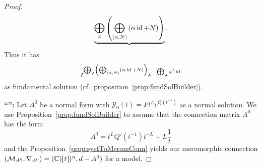 \begin{proof}
\[{{        \underbrace{%
          \bigoplus_\phi\left(
            \bigoplus_{(\alpha,N)}\left( \alpha\id+N\right)
          \right)
        }
      }
    }
    \,.
  \]
  Thus it has
  \[
    t^{\bigoplus_\varphi\left(
        \bigoplus_{(\alpha,N)}\left( \alpha\operatorname{id}+N\right)
    \right)}
    e^{-\bigoplus_\varphi\varphi'\operatorname{id}}
  \]
  as fundamental solution (cf.\ proposition~\ref{prop:fundSolBuilder}).
  \begin{comment}
    \[
      \underset{t^L}{
        \underset{\text{\rotatebox[origin=c]{-90}{$=$}}}{%
          \underbrace{\bigoplus_\phi
            t^{\bigoplus_{(\alpha,N)}\left( \alpha\id+N\right)}
          }
        }
      }
      \underset{Q'(t^{-1})}{
        \underset{\text{\rotatebox[origin=c]{-90}{$=$}}}{%
          \underbrace{\left(-\bigoplus_\phi
              \left(\phi'\id\right)
            \right)
          }
        }
      }
      \underset{t^{-L}}{
        \underset{\text{\rotatebox[origin=c]{-90}{$=$}}}{%
          \underbrace{\bigoplus_\phi
            t^{-\bigoplus_{(\alpha,N)}\left( \alpha\id+N\right)}
          }
        }
      }
      +
      \frac{1}{t}
      \underset{L}{
        \underset{\text{\rotatebox[origin=c]{-90}{$=$}}}{%
          \underbrace{%
            \bigoplus_\phi\left(
              \bigoplus_{(\alpha,N)}\left( \alpha\id+N\right)
            \right)
          }
        }
      }
      \,.
    \]
  \end{comment}
  \begin{comment}
    \textbf{OR}
    A connection matrix of $\cE^\phi\otimes\cR_\phi$ is then given by
    \[
      \bigoplus_\phi\left(
        -\phi'\id + \frac{1}{t} \bigoplus_{(\alpha,N)}\left( \alpha\id+N\right)
      \right)
      =
      \underset{Q'(t^{-1})}{
        \underset{\text{\rotatebox[origin=c]{-90}{$=$}}}{%
          \underbrace{-\bigoplus_\phi \phi'\id}
        }
      }
      +
      \frac{1}{t}
      \underset{L}{
        \underset{\text{\rotatebox[origin=c]{-90}{$=$}}}{%
          \underbrace{%
            \bigoplus_\phi\left(
              \bigoplus_{(\alpha,N)}\left( \alpha\id+N\right)
            \right)
          }
        }
      }
      \,.
    \]
  \end{comment}

  \PROBLEM{}

  \textbf{``\Leftarrow{}'':}
  Let $A^0$ be a normal form with $\mathcal{Y}_0(t)=F t^L e^{Q(t^{-1})}$ as a
  normal solution. We use Proposition~\ref{prop:fundSolBuilder} to assume that
  the connection matrix $A^0$ has the form
  \[
    A^0=t^LQ'(t^{-1})t^{-L}+L\frac{1}{t}
  \]
  and the Proposition~\ref{prop:systToMeromConn} yields our meromorphic
  connection $(\mathcal{M}_{A^0},\nabla_{A^0})=(\mathbb{C}(\!\{t\}\!)^n,d-A^0)$ for
   a model.
  \begin{comment}
    We can use Proposition~\ref{prop:MatOfSumOfMerCon} to assume, that $L$ is
    \rewrite{only one Jordan block}.
  \end{comment}

  \PROBLEM[Jordan-NF]
\end{proof}
